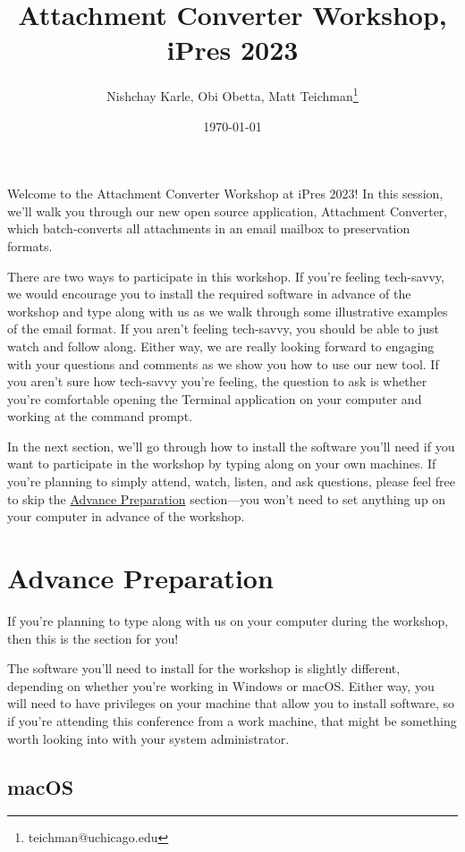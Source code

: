\documentclass[11pt]{article}
\author{Nishchay Karle, Obi Obetta, Matt Teichman\thanks{teichman@uchicago.edu}}
\date{\today}
\title{Attachment Converter Workshop, iPres 2023}
\begin{document}
\maketitle
Welcome to the Attachment Converter Workshop at iPres 2023!  In this
session, we'll walk you through our new open source application,
Attachment Converter, which batch-converts all attachments in an email
mailbox to preservation formats.

There are two ways to participate in this workshop.  If you're feeling
tech-savvy, we would encourage you to install the required software in
advance of the workshop and type along with us as we walk through some
illustrative examples of the email format.  If you aren't feeling
tech-savvy, you should be able to just watch and follow along.  Either
way, we are really looking forward to engaging with your questions and
comments as we show you how to use our new tool.  If you aren't sure
how tech-savvy you're feeling, the question to ask is whether you're
comfortable opening the Terminal application on your computer and
working at the command prompt.

In the next section, we'll go through how to install the software
you'll need if you want to participate in the workshop by typing along
on your own machines.  If you're planning to simply attend, watch,
listen, and ask questions, please feel free to skip the \hyperref[orgcc268b8]{Advance
Preparation} section---you won't need to set anything up on your
computer in advance of the workshop.

\section*{Advance Preparation \label{orgcc268b8}}
\label{sec:org619fbd6}

If you're planning to type along with us on your computer during the
workshop, then this is the section for you!

The software you'll need to install for the workshop is slightly
different, depending on whether you're working in Windows or macOS.
Either way, you will need to have privileges on your machine that
allow you to install software, so if you're attending this conference
from a work machine, that might be something worth looking into with
your system administrator.

\subsection*{macOS}
\label{sec:org0a73dc0}
\end{document}
